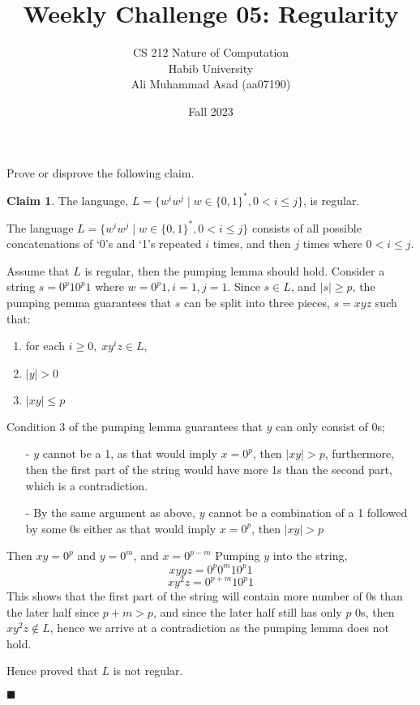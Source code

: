 \documentclass[a4paper]{exam}
\title{Weekly Challenge 05: Regularity}
\author{CS 212 Nature of Computation\\Habib University\\Ali Muhammad Asad (aa07190)}
\date{Fall 2023}
\theoremstyle{definition}
\newtheorem{claim}{Claim}
\begin{document}
\maketitle

\begin{questions}


Prove or disprove the following claim.
\begin{claim}
The language, $L = \{ w^iw^j \mid w\in\{0,1\}^*, 0 < i \le j \}$, is regular.
\end{claim}

\begin{solution}
	The language $L = \{ w^iw^j \mid w\in\{0,1\}^*, 0 < i \le j \} $ consists of all possible concatenations of `0's and `1's repeated $ i $ times, and then $ j $ times where $ 0 < i \leq j $.

	\vspace*{1mm}
	Assume that $L$ is regular, then the pumping lemma should hold. 
	Consider a string $ s = 0^p10^p1 $ where $ w = 0^p1, i = 1, j = 1 $. Since $s \in L$, and $ |s| \geq p $, the pumping pemma guarantees that $s$ can be split into three pieces, $s = xyz$ such that:
	\vspace*{-3mm}\begin{enumerate}
		\item for each $ i \geq 0, \; xy^iz \in L $, \vspace*{-2mm}
		\item $ |y| > 0 $ \vspace*{-2mm}
		\item $ |xy| \le p $
	\end{enumerate}
	Condition 3 of the pumping lemma guarantees that $y$ can only consist of 0s;\vspace*{-3mm}
	\begin{itemize}
		\item[-] $y$ cannot be a 1, as that would imply $ x = 0^p $, then $ |xy| > p $, furthermore, then the first part of the string would have more 1s than the second part, which is a contradiction. \vspace*{-2mm}
		\item[-] By the same argument as above, $ y $ cannot be a combination of a 1 followed by some 0s either as that would imply $ x = 0^p $, then $ |xy| > p $ 
	\end{itemize}
	Then $ xy = 0^p $ and $ y = 0^m $, and $ x = 0^{p - m} $
	Pumping $y$ into the string, \vspace*{-2mm} 
	$$ xyyz = 0^p0^m10^p1$$ \vspace*{-6.5mm} $$xy^2z = 0^{p + m}10^p1$$
	This shows that the first part of the string will contain more number of 0s than the later half since $ p + m > p $, and since the later half still has only $p$ 0s, then $ xy^2z \notin L $, hence we arrive at a contradiction as the pumping lemma does not hold. 

	Hence proved that $L$ is not regular.
	\begin{flushright}
		$ \blacksquare $
	\end{flushright}


	
\end{solution}
  
\end{questions}
\end{document}
